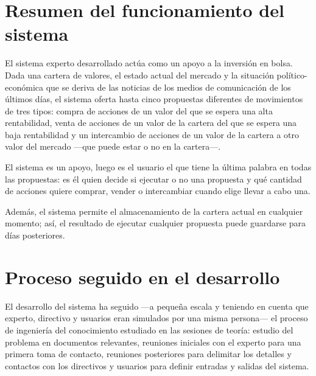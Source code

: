 \documentclass[a4paper, 11pt, titlepage]{article}
\begin{document}
    \maketitle

    \tableofcontents
    \newpage


    \section{Resumen del funcionamiento del sistema}

    El sistema experto desarrollado actúa como un apoyo a la inversión en bolsa. Dada una cartera de valores, el estado actual del mercado y la situación político-económica que se deriva de las noticias de los medios de comunicación de los últimos días, el sistema oferta hasta cinco propuestas diferentes de movimientos de tres tipos: compra de acciones de un valor del que se espera una alta rentabilidad, venta de acciones de un valor de la cartera del que se espera una baja rentabilidad y un intercambio de acciones de un valor de la cartera a otro valor del mercado ---que puede estar o no en la cartera---.

    El sistema es un apoyo, luego es el usuario el que tiene la última palabra en todas las propuestas: es él quien decide si ejecutar o no una propuesta y qué cantidad de acciones quiere comprar, vender o intercambiar cuando elige llevar a cabo una.

    Además, el sistema permite el almacenamiento de la cartera actual en cualquier momento; así, el resultado de ejecutar cualquier propuesta puede guardarse para días posteriores.


    \section{Proceso seguido en el desarrollo}

    El desarrollo del sistema ha seguido ---a pequeña escala y teniendo en cuenta que experto, directivo y usuarios eran simulados por una misma persona--- el proceso de ingeniería del conocimiento estudiado en las sesiones de teoría: estudio del problema en documentos relevantes, reuniones iniciales con el experto para una primera toma de contacto, reuniones posteriores para delimitar los detalles y contactos con los directivos y usuarios para definir entradas y salidas del sistema.
\end{document}
